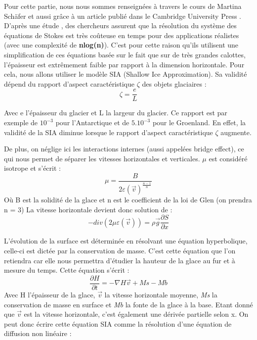 \documentclass{article}
\begin{document}
Pour cette partie, nous nous sommes renseignées à travers le cours de Martina Schäfer \cite{schafer2007modelisation} et aussi grâce à un article publié dans le Cambridge University Press  \cite{seroussi_morlighem_rignot_khazendar_larour_mouginot_2013}.
\newline
D'après une étude \cite{site3}, des chercheurs  assurent que la résolution du système des équations de Stokes est très coûteuse en temps pour des applications réalistes (avec une complexité de \textbf{nlog(n)}). C'est pour cette raison qu'ils utilisent une simplification de ces équations basée sur le fait que sur de très grandes calottes, l'épaisseur est extrêmement faible par rapport à la dimension horizontale. Pour cela, nous allons utiliser le modèle SIA (Shallow Ice Approximation). Sa validité dépend du rapport d'aspect caractéristique $\zeta$ des objets glaciaires :
\begin{equation}
\zeta = \frac{e}{L}
\label{eq2} 
\end{equation}

Avec e l'épaisseur du glacier et L la largeur du glacier. Ce rapport est par exemple de $10^{-3}$ pour l'Antarctique et de $5.10^{-3}$ pour le Groenland. En effet, la validité de la SIA diminue lorsque le rapport d'aspect caractéristique $\zeta$ augmente. 

De plus, on néglige ici les interactions internes (aussi appelées bridge effect), ce qui nous permet de séparer les vitesses horizontales et verticales. $\mu$ est considéré isotrope et s'écrit :
\begin{equation}
\mu = \frac{B}{2\varepsilon(\vec{v})^\frac{n-1}{n}}
\label{eq2}      
\end{equation}
Où B est la solidité de la glace et n est le coefficient de la loi de Glen (on prendra n = 3)
\newline
La vitesse horizontale devient donc solution de :
\begin{equation}
-div(2 \mu \varepsilon(\vec{v}))  = \rho \vec{g}\frac{{\partial}S}{\partial x}
\label{eq3}
\end{equation}
\newpage 

L'évolution de la surface est déterminée en résolvant une équation hyperbolique, celle-ci est dictée par la conservation de masse. C'est cette équation que l'on retiendra car elle nous permettra d'étudier la hauteur de la glace au fur et à mesure du temps.
Cette équation s'écrit :
\begin{equation}
\frac{\partial H}{\partial t}=-\nabla H\vec{v} + Ms - Mb
\label{eq3}
\end{equation}
Avec H l'épaisseur de la glace, $\vec{v}$ la vitesse horizontale moyenne, \textit{Ms} la conservation de masse en surface et \textit{Mb} la fonte de la glace à la base.
Etant donné que $\vec{v}$ est la vitesse horizontale, c'est également une dérivée partielle selon x.
On peut donc écrire cette équation SIA comme la résolution d'une équation de diffusion non linéaire : 
\end{document}
